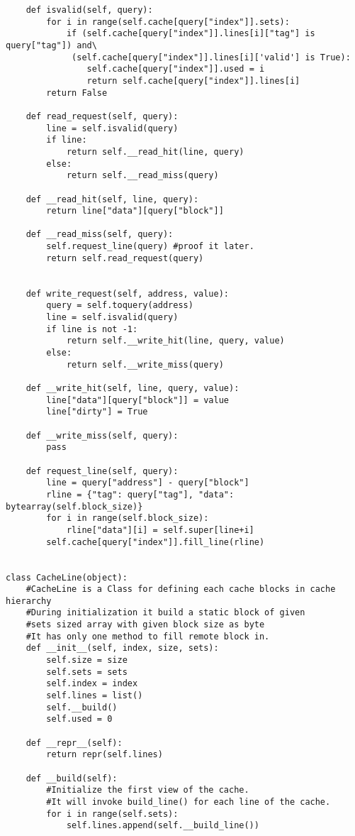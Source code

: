 \begin{lstlisting}
    def isvalid(self, query):
        for i in range(self.cache[query["index"]].sets):
            if (self.cache[query["index"]].lines[i]["tag"] is query["tag"]) and\
             (self.cache[query["index"]].lines[i]['valid'] is True):
                self.cache[query["index"]].used = i
                return self.cache[query["index"]].lines[i]
        return False

    def read_request(self, query):
        line = self.isvalid(query)
        if line:
            return self.__read_hit(line, query)
        else:
            return self.__read_miss(query)

    def __read_hit(self, line, query):
        return line["data"][query["block"]]

    def __read_miss(self, query):
        self.request_line(query) #proof it later.
        return self.read_request(query)


    def write_request(self, address, value):
        query = self.toquery(address)
        line = self.isvalid(query)
        if line is not -1:
            return self.__write_hit(line, query, value)
        else:
            return self.__write_miss(query)

    def __write_hit(self, line, query, value):
        line["data"][query["block"]] = value
        line["dirty"] = True

    def __write_miss(self, query):
        pass

    def request_line(self, query):
        line = query["address"] - query["block"]
        rline = {"tag": query["tag"], "data": bytearray(self.block_size)}
        for i in range(self.block_size):
            rline["data"][i] = self.super[line+i]
        self.cache[query["index"]].fill_line(rline)


class CacheLine(object):
    #CacheLine is a Class for defining each cache blocks in cache hierarchy
    #During initialization it build a static block of given 
    #sets sized array with given block size as byte
    #It has only one method to fill remote block in.
    def __init__(self, index, size, sets):
        self.size = size
        self.sets = sets
        self.index = index
        self.lines = list()
        self.__build()
        self.used = 0

    def __repr__(self):
        return repr(self.lines)

    def __build(self):
        #Initialize the first view of the cache.
        #It will invoke build_line() for each line of the cache.
        for i in range(self.sets):
            self.lines.append(self.__build_line())


\end{lstlisting}
